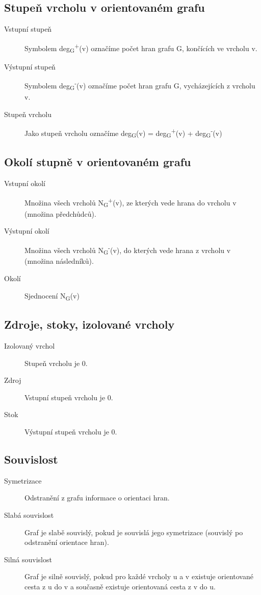 \documentclass{article}
\begin{document}
    \subsection{Stupeň vrcholu v orientovaném grafu}
      \begin{description}
        \item[Vstupní stupeň] Symbolem deg\textsubscript{G}\textsuperscript{+}(v) označíme počet hran grafu G, končících ve vrcholu v.
        \item[Výstupní stupeň] Symbolem deg\textsubscript{G}\textsuperscript{-}(v) označíme počet hran grafu G, vycházejících z vrcholu v.
        \item[Stupeň vrcholu] Jako stupeň vrcholu označíme deg\textsubscript{G}(v) = deg\textsubscript{G}\textsuperscript{+}(v) + deg\textsubscript{G}\textsuperscript{-}(v)
      \end{description}

    \subsection{Okolí stupně v orientovaném grafu}
      \begin{description}
        \item[Vstupní okolí] Množina všech vrcholů N\textsubscript{G}\textsuperscript{+}(v), ze kterých vede hrana do vrcholu v (množina předchůdců).
        \item[Výstupní okolí] Množina všech vrcholů N\textsubscript{G}\textsuperscript{-}(v), do kterých vede hrana z vrcholu v (množina následníků).
        \item[Okolí] Sjednocení N\textsubscript{G}(v)
      \end{description}

    \subsection{Zdroje, stoky, izolované vrcholy}
      \begin{description}
        \item[Izolovaný vrchol] Stupeň vrcholu je 0.
        \item[Zdroj] Vstupní stupeň vrcholu je 0.
        \item[Stok] Výstupní stupeň vrcholu je 0.
      \end{description}

    \subsection{Souvislost}
      \begin{description}
        \item[Symetrizace] Odstranění z grafu informace o orientaci hran.
        \item[Slabá souvislost] Graf je slabě souvislý, pokud je souvislá jego symetrizace (souvislý po odstranění orientace hran).
        \item[Silná souvislost] Graf je silně souvislý, pokud pro každé vrcholy u a v existuje orientované cesta z u do v a současně existuje orientovaná cesta z v do u.
      \end{description}
\end{document}
